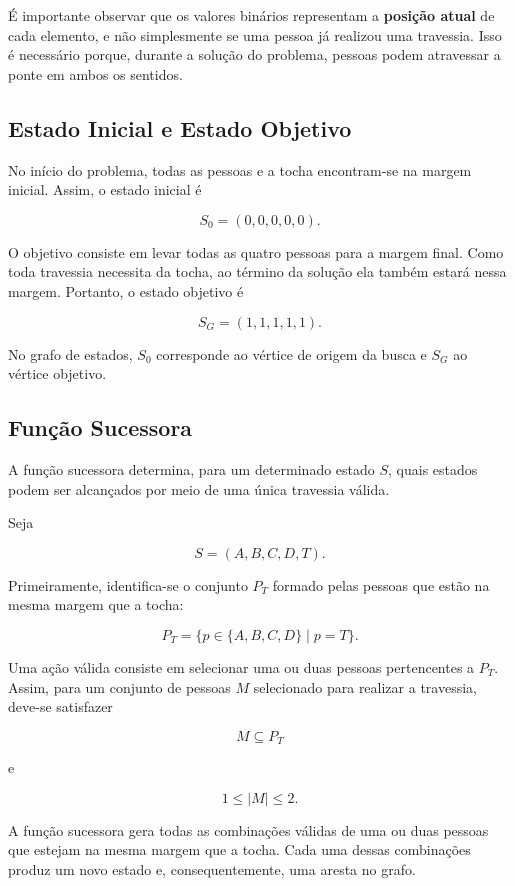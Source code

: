 \documentclass{article}
\begin{document}
É importante observar que os valores binários representam a \textbf{posição atual} de cada elemento, e não simplesmente se uma pessoa já realizou uma travessia. Isso é necessário porque, durante a solução do problema, pessoas podem atravessar a ponte em ambos os sentidos.

\subsection{Estado Inicial e Estado Objetivo}

No início do problema, todas as pessoas e a tocha encontram-se na margem inicial. Assim, o estado inicial é

\[
S_0 = (0,0,0,0,0).
\]

O objetivo consiste em levar todas as quatro pessoas para a margem final. Como toda travessia necessita da tocha, ao término da solução ela também estará nessa margem. Portanto, o estado objetivo é

\[
S_G = (1,1,1,1,1).
\]

No grafo de estados, $S_0$ corresponde ao vértice de origem da busca e $S_G$ ao vértice objetivo.

\subsection{Função Sucessora}

A função sucessora determina, para um determinado estado $S$, quais estados podem ser alcançados por meio de uma única travessia válida.

Seja

\[
S=(A,B,C,D,T).
\]

Primeiramente, identifica-se o conjunto $P_T$ formado pelas pessoas que estão na mesma margem que a tocha:

\[
P_T = \{p \in \{A,B,C,D\} \mid p = T\}.
\]

Uma ação válida consiste em selecionar uma ou duas pessoas pertencentes a $P_T$. Assim, para um conjunto de pessoas $M$ selecionado para realizar a travessia, deve-se satisfazer

\[
M \subseteq P_T
\]

e

\[
1 \leq |M| \leq 2.
\]

A função sucessora gera todas as combinações válidas de uma ou duas pessoas que estejam na mesma margem que a tocha. Cada uma dessas combinações produz um novo estado e, consequentemente, uma aresta no grafo.
\end{document}
